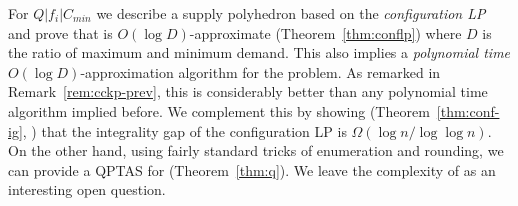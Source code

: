 For $Q|f_i|C_{min}$ we describe a supply polyhedron based on the {\em configuration LP} and prove that is $O(\log D)$-approximate (Theorem~\ref{thm:conflp}) where $D$ is the ratio of maximum and minimum demand. This also implies a {\em polynomial time} $O(\log D)$-approximation algorithm for the \cckp problem. As remarked in Remark~\ref{rem:cckp-prev}, this is considerably better than any polynomial time algorithm implied before. %
We complement this by showing (Theorem~\ref{thm:conf-ig}, ) that the integrality gap of the configuration LP is $\Omega(\log n/\log\log n)$.
On the other hand, using fairly standard tricks of enumeration and rounding, we can provide a QPTAS for \cckp (Theorem~\ref{thm:q}). We leave the complexity of \cckp as an interesting open question.







